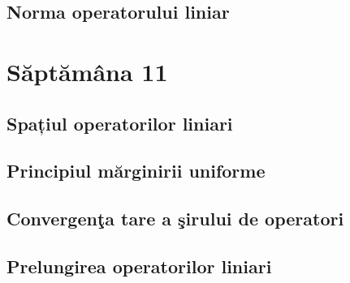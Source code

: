 \documentclass[a4paper,12pt]{article}
\theoremstyle{change}
\begin{document}
\subsection{Norma operatorului liniar}

\section{Săptămâna 11}


\subsection{Spațiul operatorilor liniari}

\subsection{Principiul mărginirii uniforme}


\subsection{Convergenţa tare a şirului de operatori}

\subsection{Prelungirea operatorilor liniari}

\end{document}
